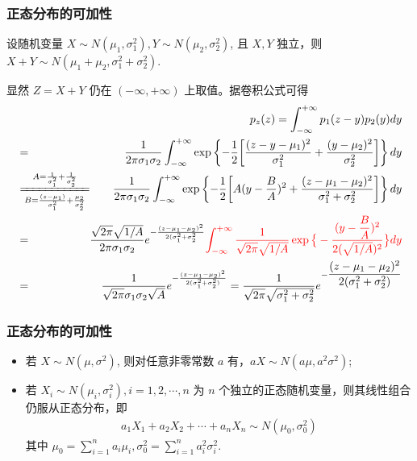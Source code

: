 \documentclass[Prob-All.tex]{subfiles}
\begin{document}
 \begin{frame}
 	\frametitle{正态分布的可加性}
 	\begin{exam}
 		设随机变量 $X\sim N (\mu_1,\sigma_1^2), Y\sim N (\mu_2,\sigma_2^2)$, 且 $X,Y$ 独立，则 $X+Y\sim N (\mu_1+\mu_2,\sigma_1^2+\sigma_2^2)$.
 	\end{exam}

 	\pause \zheng 显然 $Z=X+Y$ 仍在 $(-\infty,+\infty)$ 上取值。据卷积公式可得
 	{\small\begin{eqnarray*}
 			&&  \hspace{-2.4cm} p_z(z)=\int_{-\infty}^{+\infty}p_1(z-y)p_2(y)dy\\
 			&=&\dfrac{1}{2\pi\sigma_1\sigma_2}\int_{-\infty}^{+\infty}\exp\left\{-\dfrac{1}{2}\bigg[\dfrac{(z-y-\mu_1)^2}{\sigma_1^2}+\dfrac{(y-\mu_2)^2}{\sigma_2^2}\bigg]\right\}dy\\
 			&\xlongequal[B=\frac{(z-\mu_1)}{\sigma_1^2}+\frac{\mu_2}{\sigma_2^2}]{A=\frac{1}{\sigma_1^2}+\frac{1}{\sigma_2^2}}&\dfrac{1}{2\pi\sigma_1\sigma_2}\int_{-\infty}^{+\infty}\exp\left\{-\dfrac{1}{2}\bigg[A(y-\dfrac{B}{A})^2+\dfrac{(z-\mu_1-\mu_2)^2}{\sigma_1^2+\sigma_2^2}\bigg]\right\}dy\\
 			&=&\hspace{-0.5cm}\dfrac{\sqrt{2\pi}\sqrt{1/A}}{2\pi\sigma_1\sigma_2}e^{-\frac{(z-\mu_1-\mu_2)^2}{2(\sigma_1^2+\sigma_2^2}}\textcolor{red}{\int_{-\infty}^{+\infty}\frac{1}{\sqrt{2\pi}\sqrt{1/A}}\exp\big\{-\dfrac{(y-\dfrac{B}{A})^2}{2(\sqrt{1/A})^2}\big\}dy}\\
 			&=&\dfrac{1}{\sqrt{2\pi}\sigma_1\sigma_2\sqrt{A}}e^{-\frac{(z-\mu_1-\mu_2)^2}{2(\sigma_1^2+\sigma_2^2)}}=\dfrac{1}{\sqrt{2\pi}\sqrt{\sigma_1^2+\sigma_2^2}}e^{-\dfrac{(z-\mu_1-\mu_2)^2}{2(\sigma_1^2+\sigma_2^2)}}
 	\end{eqnarray*}}

 \end{frame}
 \begin{frame}
 	\frametitle{正态分布的可加性}
 	\begin{itemize}[<+-|alert@+>]
 		\item 若 $X\sim N (\mu,\sigma^2)$, 则对任意非零常数 $a$ 有，$aX\sim N (a\mu,a^2\sigma^2)$;
 		\item 若 $X_i\sim N (\mu_i,\sigma_i^2), i=1,2,\cdots, n$ 为 $n$ 个独立的正态随机变量，则其线性组合仍服从正态分布，即
 		\begin{eqnarray*}
 			a_1X_1+a_2X_2+\cdots+a_nX_n\sim N(\mu_0,\sigma_0^2)
 		\end{eqnarray*}
 		其中 $\mu_0=\sum_{i=1}^na_i\mu_i, \sigma_0^2=\sum_{i=1}^na_i^2\sigma_i^2$.


 	\end{itemize}
 \end{frame}
\end{document}
